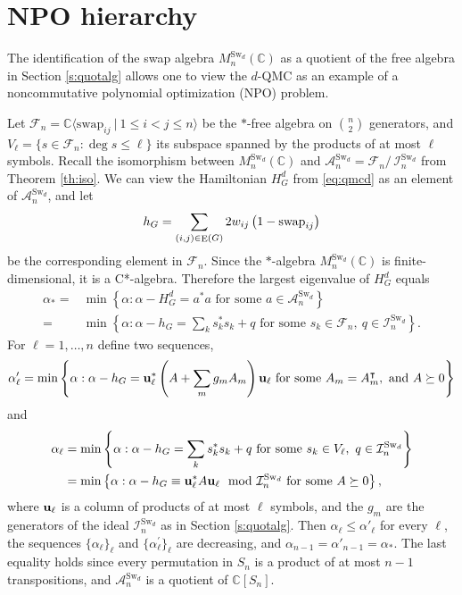 \documentclass[12pt,dvipsnames,accepted=2016-08-18,a4paper,onecolumn]{quantumarticle}
\DeclareMathOperator{\EE}{E}
\numberwithin{equation}{section}
\newcommand{\CC}{\mathbb C}
\newcommand{\cA}{\mathcal A}
\newcommand{\cF}{\mathcal F}
\theoremstyle{definition}
\begin{document}
\section{NPO hierarchy}\label{s:npo}

The identification of the swap algebra $M^{\text{Sw}_d}_n(\mathbb{C})$ as a quotient of the free algebra in Section \ref{s:quotalg} allows one to view the $d$-QMC as an example of a noncommutative polynomial optimization (NPO) problem.

Let $\cF_n=\CC\langle \text{swap}_{ij} \ | \ 1 \leq i < j \leq n\rangle$ be the $*$-free algebra on $\binom{n}{2}$ generators, and $V_\ell=\{s\in\cF_n\colon \deg s\le \ell\}$ its subspace spanned by the products of at most $\ell$  symbols.
Recall the isomorphism between $M^{\text{Sw}_d}_n(\CC)$ and $\cA^{\text{Sw}_d}_n=\cF_n /\, \mathcal{I}^{\text{Sw}_d}_n$ from Theorem \ref{th:iso}.
We can view the Hamiltonian $H_G^{d}$ from \eqref{eq:qmcd} as an element of $\cA^{\text{Sw}_d}_n$, and let
$$h_G = \sum_{(i,j) \in \EE(G)} 2 w_{ij} \left(1 - \textnormal{swap}_{ij}\right)$$
be the corresponding element in $\cF_n$.
Since the $*$-algebra $M^{\text{Sw}_d}_n(\CC)$ is finite-dimensional, it is a C*-algebra. Therefore the largest eigenvalue of $H_G^{d}$ equals
\begin{align*}
\alpha_*=&\min\left\{
\alpha:\alpha-H_G^{d}=a^*a \text{ for some } a\in \cA^{\text{Sw}_d}_n
\right\} \\
=&\min\left\{
\alpha:\alpha-h_G=\sum_k s_k^*s_k+q  
\text{ for some } 
s_k\in\cF_n,\ q\in \mathcal{I}^{\text{Sw}_d}_n
\right\}.
\end{align*}
For $\ell=1,\dots,n$ define two sequences,
\begin{equation}\label{e:relax2}
\alpha'_\ell
=
\min\left\{
\alpha:\alpha-h_G={\bf u}_\ell^*\left(A+\sum_m g_m A_m\right){\bf u}_\ell \text{ for some }A_m=A_m^\intercal,\text{ and }A\succeq0 
\right\}
\end{equation}
and
\begin{equation}\label{e:relax}
\begin{split}
\alpha_\ell
&=
\min\left\{
\alpha:\alpha-h_G=\sum_k s_k^*s_k+q  
\text{ for some } 
s_k\in V_\ell,\ q\in \mathcal{I}^{\text{Sw}_d}_n
\right\}\\
&=
\min\left\{
\alpha:\alpha-h_G\equiv{\bf u}_\ell^*A{\bf u}_\ell \mod\mathcal{I}^{\text{Sw}_d}_n \text{ for some } A\succeq0 
\right\},
\end{split}
\end{equation}
where ${\bf u}_\ell$ is a column of products of at most $\ell$  symbols, and the $g_m$ are the generators of the ideal $\mathcal{I}^{\text{Sw}_d}_n$ as in Section \ref{s:quotalg}.
Then $\alpha_\ell\le \alpha'_\ell$ for every $\ell$, the sequences $\{\alpha_\ell\}_\ell$ and $\{\alpha^\prime_\ell\}_\ell$ are decreasing, and $\alpha_{n-1}=\alpha'_{n-1}=\alpha_*$. The last equality holds since every permutation in $S_n$ is a product of at most $n-1$ transpositions, and $\cA^{\text{Sw}_d}_n$ is a quotient of $\CC[S_n]$.
\end{document}
